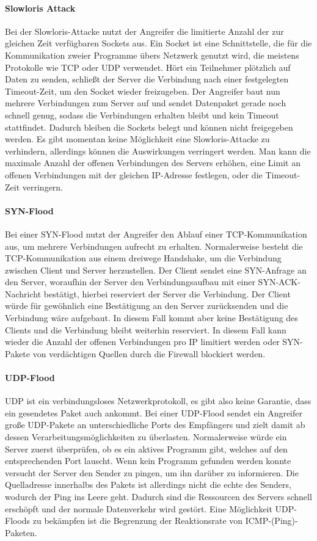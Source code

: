 \documentclass{article}
\begin{document}
    \paragraph{Slowloris Attack} Bei der Slowloris-Attacke nutzt der Angreifer die limitierte Anzahl der zur gleichen Zeit verfügbaren 
    Sockets aus. Ein Socket ist eine Schnittstelle, die für die Kommunikation zweier Programme übers Netzwerk genutzt wird, die meistens
    Protokolle wie TCP oder UDP verwendet. Hört ein Teilnehmer plötzlich auf Daten zu senden, schließt der Server die Verbindung nach einer
    festgelegten Timeout-Zeit, um den Socket wieder freizugeben. Der Angreifer baut nun mehrere Verbindungen
    zum Server auf und sendet Datenpaket gerade noch schnell genug, sodass die Verbindungen erhalten bleibt und kein
    Timeout stattfindet. Dadurch bleiben die Sockets belegt und können nicht freigegeben werden. Es gibt momentan
    keine Möglichkeit eine Slowloris-Attacke zu verhindern, allerdings können die Auswirkungen verringert werden. 
    Man kann die maximale Anzahl der offenen Verbindungen des Servers erhöhen, eine Limit an offenen Verbindungen
    mit der gleichen IP-Adresse festlegen, oder die Timeout-Zeit verringern.
    \paragraph{SYN-Flood} Bei einer SYN-Flood nutzt der Angreifer den Ablauf einer TCP-Kommunikation aus, um mehrere
    Verbindungen aufrecht zu erhalten. Normalerweise besteht die TCP-Kommunikation aus einem dreiwege Handshake, um
    die Verbindung zwischen Client und Server herzustellen. Der Client sendet eine SYN-Anfrage an den Server,
    woraufhin der Server den Verbindungsaufbau mit einer SYN-ACK-Nachricht bestätigt, hierbei reserviert der Server
    die Verbindung. Der Client würde für gewöhnlich eine Bestätigung an den Server zurücksenden und die Verbindung wäre
    aufgebaut. In diesem Fall kommt aber keine Bestätigung des Clients und die Verbindung bleibt weiterhin reserviert.
    In diesem Fall kann wieder die Anzahl der offenen Verbindungen pro IP limitiert werden oder SYN-Pakete von 
    verdächtigen Quellen durch die Firewall blockiert werden.
    \paragraph{UDP-Flood} UDP ist ein verbindungsloses Netzwerkprotokoll, es gibt also keine Garantie, dass ein gesendetes
    Paket auch ankommt. Bei einer UDP-Flood sendet ein Angreifer große UDP-Pakete an unterschiedliche Ports des Empfängers und
    zielt damit ab dessen Verarbeitungsmöglichkeiten zu überlasten. Normalerweise würde ein Server zuerst überprüfen, ob es
    ein aktives Programm gibt, welches auf den entsprechenden Port lauscht. Wenn kein Programm gefunden werden konnte
    versucht der Server den Sender zu pingen, um ihn darüber zu informieren. Die Quelladresse innerhalbs des Pakets
    ist allerdings nicht die echte des Senders, wodurch der Ping ins Leere geht. Dadurch sind die Ressourcen des 
    Servers schnell erschöpft und der normale Datenverkehr wird gestört. Eine Möglichkeit UDP-Floods zu bekämpfen ist die
    Begrenzung der Reaktionsrate von ICMP-(Ping)-Paketen.
\end{document}
